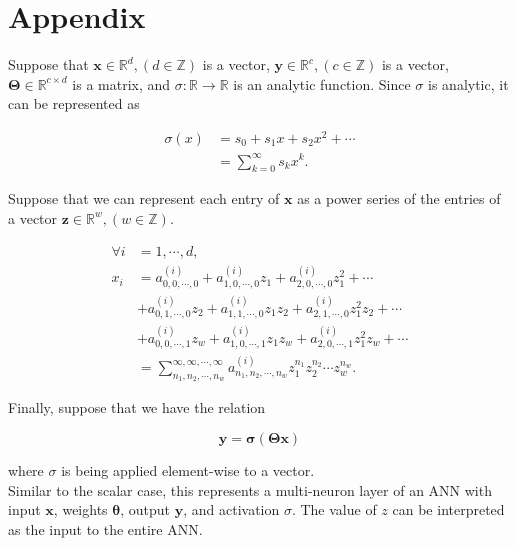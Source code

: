 \section{Appendix}\label{sec:appendix}


Suppose that $\mathbf{x} \in \mathbb{R}^d, (d \in \mathbb{Z})$ is a vector, $\mathbf{y} \in \mathbb{R}^c, (c \in \mathbb{Z})$ is a vector, $\mathbf{\Theta} \in \mathbb{R}^{c \times d}$ is a matrix, and $\sigma: \mathbb{R} \to \mathbb{R}$ is an analytic function. Since $\sigma$ is analytic, it can be represented as

\begin{align}
    \sigma(x)
    &= s_0 + s_1 x + s_2 x^2 + \cdots \nonumber \\
    &= \sum_{k=0}^{\infty} s_{k} x^{k}.
    \label{eqn:vector layer activation}
\end{align}

Suppose that we can represent each entry of $\mathbf{x}$ as a power series of the entries of a vector $\mathbf{z} \in \mathbb{R}^{w}, (w \in \mathbb{Z})$.

\begin{align}
    \forall i &= 1, \cdots, d, \nonumber \\ x_i
    &= a^{(i)}_{0,0,\cdots,0} + a^{(i)}_{1,0,\cdots,0} z_1 + a^{(i)}_{2,0,\cdots,0} z_1^2 + \cdots \nonumber \\
    &+ a^{(i)}_{0,1,\cdots,0} z_2 + a^{(i)}_{1,1,\cdots,0} z_1 z_2 + a^{(i)}_{2,1,\cdots,0} z_1^2 z_2 + \cdots \nonumber \\
    &+ a^{(i)}_{0,0,\cdots,1} z_w + a^{(i)}_{1,0,\cdots,1} z_1 z_w + a^{(i)}_{2,0,\cdots,1} z_1^2 z_w + \cdots \nonumber \\
    &= \sum_{n_1,n_2,\cdots,n_w}^{\infty,\infty,\cdots,\infty} a^{(i)}_{n_1,n_2,\cdots,n_w} z_1^{n_1} z_2^{n_2} \cdots z_w^{n_w}.
    \label{eqn:vector x series}
\end{align}

Finally, suppose that we have the relation

\begin{equation}
    \mathbf{y} = \mathbf{\sigma}(\mathbf{\Theta} \mathbf{x})
    \label{eqn:vector layer relation}
\end{equation}

where $\sigma$ is being applied element-wise to a vector.\\

Similar to the scalar case, this represents a multi-neuron layer of an ANN with input $\mathbf{x}$, weights $\mathbf{\theta}$, output $\mathbf{y}$, and activation $\sigma$. The value of $z$ can be interpreted as the input to the entire ANN.

